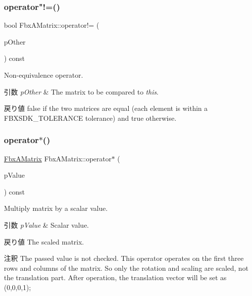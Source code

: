 \subsubsection{\texorpdfstring{operator"!=()}{operator!=()}}
{\footnotesize\ttfamily bool Fbx\+A\+Matrix\+::operator!= (\begin{DoxyParamCaption}\item[{const \hyperlink{class_fbx_a_matrix}{Fbx\+A\+Matrix} \&}]{p\+Other }\end{DoxyParamCaption}) const}

Non-\/equivalence operator. 
\begin{DoxyParams}{引数}
{\em p\+Other} & The matrix to be compared to {\itshape this}. \\
\hline
\end{DoxyParams}
\begin{DoxyReturn}{戻り値}
{\ttfamily false} if the two matrices are equal (each element is within a F\+B\+X\+S\+D\+K\+\_\+\+T\+O\+L\+E\+R\+A\+N\+CE tolerance) and {\ttfamily true} otherwise. 
\end{DoxyReturn}
\mbox{\label{class_fbx_a_matrix_abc19f68d91ce2dd5303c9ab398e12eee}} 
\subsubsection{\texorpdfstring{operator$\ast$()}{operator*()}\hspace{0.1cm}{\footnotesize\ttfamily [1/2]}}
{\footnotesize\ttfamily \hyperlink{class_fbx_a_matrix}{Fbx\+A\+Matrix} Fbx\+A\+Matrix\+::operator$\ast$ (\begin{DoxyParamCaption}\item[{\hyperlink{class_fbx_a_matrix_ad463edbb9fea344643297701f159faa7}{double}}]{p\+Value }\end{DoxyParamCaption}) const}

Multiply matrix by a scalar value. 
\begin{DoxyParams}{引数}
{\em p\+Value} & Scalar value. \\
\hline
\end{DoxyParams}
\begin{DoxyReturn}{戻り値}
The scaled matrix. 
\end{DoxyReturn}
\begin{DoxyRemark}{注釈}
The passed value is not checked. This operator operates on the first three rows and columns of the matrix. So only the rotation and scaling are scaled, not the translation part. After operation, the translation vector will be set as (0,0,0,1); 
\end{DoxyRemark}
\mbox{\label{class_fbx_a_matrix_a653885060d7c3966ea2a778a188052c7}} 
